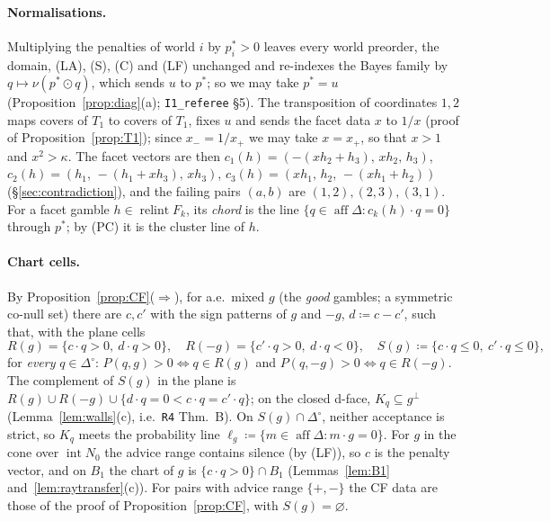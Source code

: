 \documentclass[11pt]{article}
\theoremstyle{definition}
\theoremstyle{remark}
\newcommand{\Di}{\Delta^{\circ}}
\newcommand{\relint}{\operatorname{relint}}
\newcommand{\aff}{\operatorname{aff}}
\newcommand{\src}[1]{\texttt{#1}}
\begin{document}
\paragraph{Normalisations.} Multiplying the penalties of world $i$ by $p^*_i>0$ leaves every world preorder, the domain, (LA), (S), (C) and (LF) unchanged and re-indexes the Bayes family by $q\mapsto\nu(p^*\odot q)$, which sends $u$ to $p^*$; so we may take $p^*=u$ (Proposition~\ref{prop:diag}(a); \src{I1\_referee} \S5). The transposition of coordinates $1,2$ maps covers of $T_1$ to covers of $T_1$, fixes $u$ and sends the facet data $x$ to $1/x$ (proof of Proposition~\ref{prop:T1}); since $x_-=1/x_+$ we may take $x=x_+$, so that $x>1$ and $x^2>\kappa$. The facet vectors are then $c_1(h)=(-(xh_2+h_3),\,xh_2,\,h_3)$, $c_2(h)=(h_1,\,-(h_1+xh_3),\,xh_3)$, $c_3(h)=(xh_1,\,h_2,\,-(xh_1+h_2))$ (\S\ref{sec:contradiction}), and the failing pairs $(a,b)$ are $(1,2),(2,3),(3,1)$. For a facet gamble $h\in\relint F_k$, its \emph{chord} is the line $\{q\in\aff\Delta:c_k(h)\cdot q=0\}$ through $p^*$; by (PC) it is the cluster line of $h$.

\paragraph{Chart cells.} By Proposition~\ref{prop:CF}($\Rightarrow$), for a.e.\ mixed $g$ (the \emph{good} gambles; a symmetric co-null set) there are $c,c'$ with the sign patterns of $g$ and $-g$, $d\coloneqq c-c'$, such that, with the plane cells
\[
R(g)=\{c\cdot q>0,\ d\cdot q>0\},\quad R(-g)=\{c'\cdot q>0,\ d\cdot q<0\},\quad S(g)\coloneqq\{c\cdot q\le0,\ c'\cdot q\le0\},
\]
for \emph{every} $q\in\Di$: $P(q,g)>0\iff q\in R(g)$ and $P(q,-g)>0\iff q\in R(-g)$. The complement of $S(g)$ in the plane is $R(g)\cup R(-g)\cup\{d\cdot q=0<c\cdot q=c'\cdot q\}$; on the closed d-face, $K_q\subseteq g^\perp$ (Lemma~\ref{lem:walls}(c), i.e.\ \src{R4} Thm.~B). On $S(g)\cap\Di$, neither acceptance is strict, so $K_q$ meets the probability line $\ell_g\coloneqq\{m\in\aff\Delta:m\cdot g=0\}$. For $g$ in the cone over $\operatorname{int}N_0$ the advice range contains silence (by (LF)), so $c$ is the penalty vector, and on $B_1$ the chart of $g$ is $\{c\cdot q>0\}\cap B_1$ (Lemmas~\ref{lem:B1} and~\ref{lem:raytransfer}(c)). For pairs with advice range $\{+,-\}$ the CF data are those of the proof of Proposition~\ref{prop:CF}, with $S(g)=\varnothing$.
\end{document}
